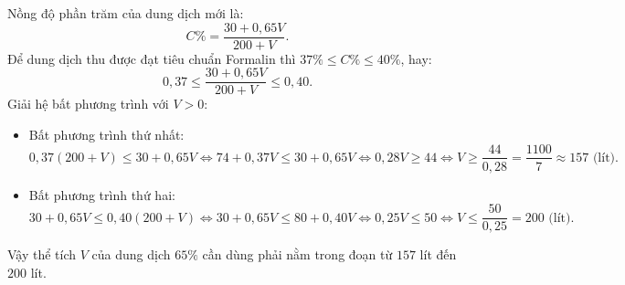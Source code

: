 \begin{bt}
{\begin{enumerate}[a)]
	Nồng độ phần trăm của dung dịch mới là:
	$$ C\% = \dfrac{30 + 0{,}65V}{200 + V}. $$
	Để dung dịch thu được đạt tiêu chuẩn Formalin thì $37\% \le C\% \le 40\%$, hay:
	$$ 0{,}37 \le \dfrac{30 + 0{,}65V}{200 + V} \le 0{,}40. $$
	Giải hệ bất phương trình với $V > 0$:
	\begin{itemize}
		\item Bất phương trình thứ nhất:
		$$ 0{,}37(200 + V) \le 30 + 0{,}65V \iff 74 + 0{,}37V \le 30 + 0{,}65V \iff 0{,}28V \ge 44 \iff V \ge \dfrac{44}{0{,}28} = \dfrac{1100}{7} \approx 157\text{ (lít)}. $$
		\item Bất phương trình thứ hai:
		$$ 30 + 0{,}65V \le 0{,}40(200 + V) \iff 30 + 0{,}65V \le 80 + 0{,}40V \iff 0{,}25V \le 50 \iff V \le \dfrac{50}{0{,}25} = 200\text{ (lít)}. $$
	\end{itemize}
	Vậy thể tích $V$ của dung dịch $65\%$ cần dùng phải nằm trong đoạn từ $157$ lít đến $200$ lít.
\end{enumerate}
}
\end{bt}

